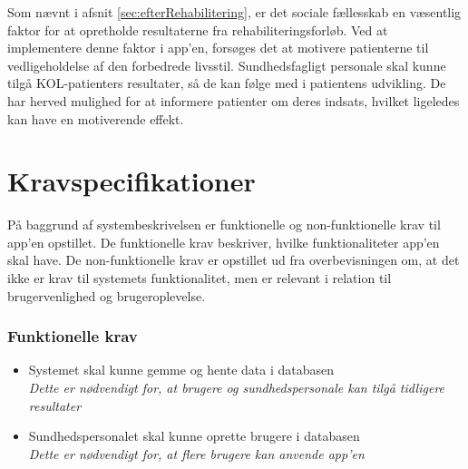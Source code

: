 Som nævnt i afsnit \ref{sec:efterRehabilitering}, er det sociale fællesskab en væsentlig faktor for at opretholde resultaterne fra rehabiliteringsforløb. Ved at implementere denne faktor i app'en, forsøges det at motivere patienterne til vedligeholdelse af den forbedrede livsstil. Sundhedsfagligt personale skal kunne tilgå KOL-patienters resultater, så de kan følge med i patientens udvikling. De har herved mulighed for at informere patienter om deres indsats, hvilket ligeledes kan have en motiverende effekt.\citep{Gade2007, Tricomi2016}


\section{Kravspecifikationer} \label{sec:funktionellekrav}
På baggrund af systembeskrivelsen er funktionelle og non-funktionelle krav til app'en opstillet. De funktionelle krav beskriver, hvilke funktionaliteter app'en skal have. De non-funktionelle krav er opstillet ud fra overbevisningen om, at det ikke er krav til systemets funktionalitet, men er relevant i relation til brugervenlighed og brugeroplevelse. 


\subsubsection{Funktionelle krav}

\noindent
\begin{itemize}
\item Systemet skal kunne gemme og hente data i databasen
	\\
	\textit{Dette er nødvendigt for, at brugere og sundhedspersonale kan tilgå tidligere resultater}	
\item Sundhedspersonalet skal kunne oprette brugere i databasen
	\\
	\textit{Dette er nødvendigt for, at flere brugere kan anvende app'en}
\end{itemize}
	
